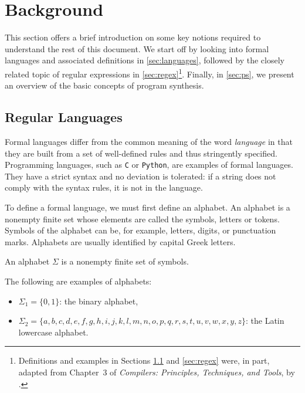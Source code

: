 \chapter{Background}\label{sec:background}
This section offers a brief introduction on some key notions required to understand the rest of this document.
We start off by looking into formal languages and associated definitions in \autoref{sec:languages}, followed by the closely related topic of regular expressions in \autoref{sec:regex}\footnote{Definitions and examples in Sections \ref{sec:languages} and \ref{sec:regex}
were, in part, adapted from Chapter~3 of \textit{Compilers: Principles, Techniques, and Tools}, by \citet*{DragonBook}.}. Finally, in \autoref{sec:ps}, we present an overview of the basic concepts of program synthesis.

\section{Regular Languages}\label{sec:languages}
Formal languages differ from the common meaning of the word \textit{language} in that they are built from a set of well-defined rules and thus stringently specified. Programming languages, such as \texttt{C} or \texttt{Python}, are examples of formal languages. They have a strict syntax and no deviation is tolerated: if a string does not comply with the syntax rules, it is not in the language.

To define a formal language, we must first define an alphabet.
An alphabet is a nonempty finite set whose elements are called the symbols, letters or tokens.
Symbols of the alphabet can be, for example, letters, digits, or punctuation marks. Alphabets are usually identified by capital Greek letters.

\begin{definition}[Alphabet]
An alphabet \(\Sigma\) is a nonempty finite set of symbols.
\end{definition}

\begin{example}
The following are examples of alphabets:

\begin{itemize}[topsep=0pt]
\item \(\Sigma_1 = \{0,1\}\): the binary alphabet,
\item \(\Sigma_2 = \{a,b,c,d,e,f,g,h,i,j,k,l,m,n,o,p,q,r,s,t,u,v,w,x,y,z\}\): the Latin lowercase alphabet.
\end{itemize}
\end{example}

